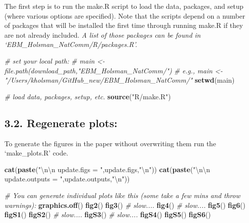 \documentclass[]{article}
\newenvironment{Shaded}{\begin{snugshade}}{\end{snugshade}}
\newcommand{\KeywordTok}[1]{\textcolor[rgb]{0.13,0.29,0.53}{\textbf{{#1}}}}
\newcommand{\CharTok}[1]{\textcolor[rgb]{0.31,0.60,0.02}{{#1}}}
\newcommand{\StringTok}[1]{\textcolor[rgb]{0.31,0.60,0.02}{{#1}}}
\newcommand{\CommentTok}[1]{\textcolor[rgb]{0.56,0.35,0.01}{\textit{{#1}}}}
\newcommand{\NormalTok}[1]{{#1}}
\begin{document}
The first step is to run the make.R script to load the data, packages,
and setup (where various options are specified). Note that the scripts
depend on a number of packages that will be installed the first time
through running make.R if they are not already included. \emph{A list of
those packages can be found in `EBM\_Holsman\_NatComm/R/packages.R'.}

\begin{Shaded}
\begin{Highlighting}[]
    \CommentTok{# set your local path:}
    \CommentTok{# main        <-  file.path(download_path,"EBM_Holsman_NatComm/")}
    \CommentTok{# e.g., main  <-  "/Users/kholsman/GitHub_new/EBM_Holsman_NatComm/"}
    \KeywordTok{setwd}\NormalTok{(main)}
    
    \CommentTok{# load data, packages, setup, etc.}
    \KeywordTok{source}\NormalTok{(}\StringTok{"R/make.R"}\NormalTok{)}
\end{Highlighting}
\end{Shaded}

\subsection{3.2. Regenerate plots:}\label{regenerate-plots}

To generate the figures in the paper without overwriting them run the
`make\_plots.R' code.

\begin{Shaded}
\begin{Highlighting}[]
    \KeywordTok{cat}\NormalTok{(}\KeywordTok{paste}\NormalTok{(}\StringTok{"}\CharTok{\textbackslash{}n\textbackslash{}n}\StringTok{ update.figs  = "}\NormalTok{,update.figs,}\StringTok{"}\CharTok{\textbackslash{}n}\StringTok{"}\NormalTok{))}
    \KeywordTok{cat}\NormalTok{(}\KeywordTok{paste}\NormalTok{(}\StringTok{"}\CharTok{\textbackslash{}n\textbackslash{}n}\StringTok{ update.outputs  = "}\NormalTok{,update.outputs,}\StringTok{"}\CharTok{\textbackslash{}n}\StringTok{"}\NormalTok{))}

    \CommentTok{# You can generate individual plots like this (some take a few mins and throw warnings):}
    \KeywordTok{graphics.off}\NormalTok{()}
    \KeywordTok{fig2}\NormalTok{()}
    \KeywordTok{fig3}\NormalTok{() }\CommentTok{#  slow....}
    \KeywordTok{fig4}\NormalTok{() }\CommentTok{#  slow....}
    \KeywordTok{fig5}\NormalTok{()}
    \KeywordTok{fig6}\NormalTok{()}
    \KeywordTok{figS1}\NormalTok{()}
    \KeywordTok{figS2}\NormalTok{() }\CommentTok{#  slow....}
    \KeywordTok{figS3}\NormalTok{() }\CommentTok{#  slow....}
    \KeywordTok{figS4}\NormalTok{()}
    \KeywordTok{figS5}\NormalTok{()}
    \KeywordTok{figS6}\NormalTok{()}
\end{Highlighting}
\end{Shaded}
\end{document}
